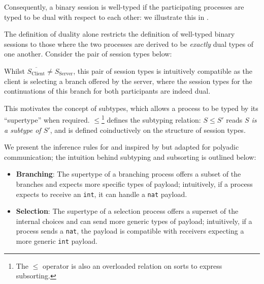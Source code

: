 Consequently, a binary session is well-typed if the participating processes are typed to be dual with respect to each other: we illustrate this in .


The definition of duality alone restricts the definition of well-typed binary sessions to those where the two processes are derived to be \textit{exactly} dual types of one another. Consider the pair of session types below:


Whilst $\overline{S_{\text{Client}}} \neq S_{\text{Server}}$, this pair of session types is intuitively compatible as the client is selecting a branch offered by the server, where the session types for the continuations of this branch for both participants are indeed dual.

This motivates the concept of {subtypes}, which allows a process to be typed by its ``supertype'' when required. $\leqslant$\footnote{The $\leqslant$ operator is also an overloaded relation on sorts to express subsorting.} defines the subtyping relation: $S \leqslant S'$ reads \textit{$S$ is a subtype of $S'$}, and is defined coinductively on the structure of session types.

We present the inference rules for  and  inspired by \cite{MPST} but adapted for polyadic communication; the intuition behind subtyping and subsorting is outlined below:

\begin{itemize}
\item \textbf{Branching}: The supertype of a branching process offers a subset of the branches and expects more specific types of payload; intuitively, if a process expects to receive an \texttt{int}, it can handle a \texttt{nat} payload.
\item \textbf{Selection}: The supertype of a selection process offers a superset of the internal choices and can send more generic types of payload; intuitively, if a process sends a \texttt{nat}, the payload is compatible with receivers expecting a more generic \texttt{int} payload.
\end{itemize}

